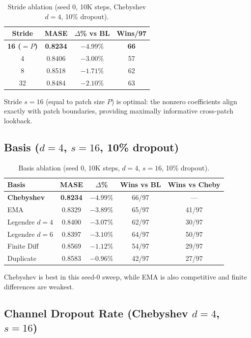 \documentclass{article}
\begin{document}
\begin{table}[H]
\centering
\caption{Stride ablation (seed 0, 10K steps, Chebyshev $d=4$, 10\% dropout).}
\small
\begin{tabular}{cccc}
\toprule
\textbf{Stride} & \textbf{MASE} & \textbf{$\Delta$\% vs BL} & \textbf{Wins/97} \\
\midrule
\textbf{16 ($=P$)} & \textbf{0.8234} & $\mathbf{-4.99\%}$ & \textbf{66} \\
4 & 0.8406 & $-3.00\%$ & 57 \\
8 & 0.8518 & $-1.71\%$ & 62 \\
32 & 0.8484 & $-2.10\%$ & 63 \\
\bottomrule
\end{tabular}
\end{table}

Stride $s=16$ (equal to patch size $P$) is optimal: the nonzero coefficients align exactly with patch boundaries, providing maximally informative cross-patch lookback.

\subsection{Basis ($d=4$, $s=16$, 10\% dropout)}

\begin{table}[H]
\centering
\caption{Basis ablation (seed 0, 10K steps, $d=4$, $s=16$, 10\% dropout).}
\small
\begin{tabular}{lcccc}
\toprule
\textbf{Basis} & \textbf{MASE} & \textbf{$\Delta$\%} & \textbf{Wins vs BL} & \textbf{Wins vs Cheby} \\
\midrule
\textbf{Chebyshev} & \textbf{0.8234} & $\mathbf{-4.99\%}$ & 66/97 & --- \\
EMA & 0.8329 & $-3.89\%$ & 65/97 & 41/97 \\
Legendre $d=4$ & 0.8400 & $-3.07\%$ & 62/97 & 30/97 \\
Legendre $d=6$ & 0.8397 & $-3.10\%$ & 64/97 & 50/97 \\
Finite Diff & 0.8569 & $-1.12\%$ & 54/97 & 29/97 \\
Duplicate & 0.8583 & $-0.96\%$ & 42/97 & 27/97 \\
\bottomrule
\end{tabular}
\end{table}

Chebyshev is best in this seed-0 sweep, while EMA is also competitive and finite differences are weakest.

\subsection{Channel Dropout Rate (Chebyshev $d=4$, $s=16$)}
\end{document}

